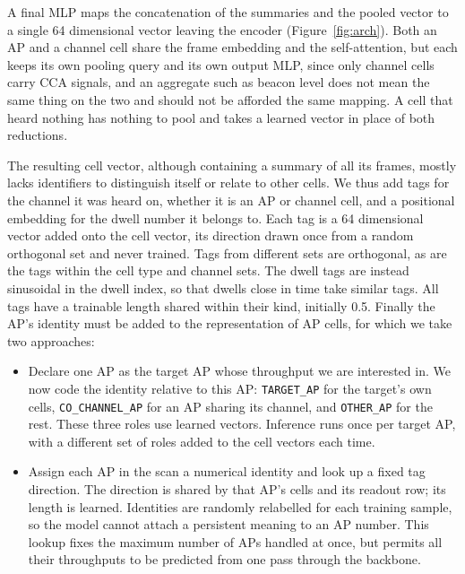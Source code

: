 \documentclass[conference]{IEEEtran}
\newcommand{\code}[1]{\texttt{\small #1}}
\begin{document}
A final MLP maps the concatenation of the summaries and the pooled vector 
to a single 64 dimensional vector leaving the encoder (Figure~\ref{fig:arch}). 
Both an AP and a channel cell share the frame embedding and the self-attention,
but each keeps its own pooling query and its own output MLP, since only 
channel cells carry CCA signals, and an aggregate such as beacon
level does not mean the same thing on the two and should not be afforded the same 
mapping. A cell that heard nothing has nothing to pool and takes a learned 
vector in place of both reductions.

The resulting cell vector, although containing a summary of all its frames, mostly
lacks identifiers to distinguish itself or relate to other cells. We thus add tags
for the channel it was heard on, whether it is an AP or channel cell, and a positional
embedding for the dwell number it belongs to. Each tag is a 64 dimensional vector added onto the cell
vector, its direction drawn once from a random orthogonal set and never
trained. Tags from different sets are orthogonal, as are the tags within the
cell type and channel sets. The dwell tags are instead sinusoidal in the dwell
index, so that dwells close in time take similar tags. 
All tags have a trainable length shared within their kind, initially 0.5. 
Finally the AP's identity must be added to the representation of AP cells, 
for which we take two approaches:

\begin{itemize}
  \item Declare one AP as the target AP whose throughput we are interested in.
  We now code the identity relative to this AP: \code{TARGET\_AP} for the target's
  own cells, \code{CO\_CHANNEL\_AP} for an AP sharing its channel, and
  \code{OTHER\_AP} for the rest. These three roles use learned vectors.
  Inference runs once per target AP,
  with a different set of roles added to the cell vectors each time.

  \item Assign each AP in the scan a numerical identity and look up a fixed
  tag direction. The direction is shared by that AP's cells and its readout row;
  its length is learned. Identities are randomly relabelled for each training
  sample, so the model cannot attach a persistent meaning to an AP number.
  This lookup fixes the maximum number of APs handled at once, but permits all 
  their throughputs to be predicted from one pass through the backbone.
\end{itemize}
\end{document}
